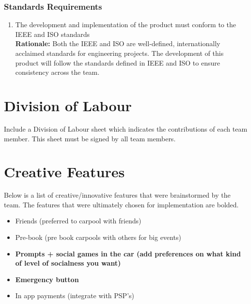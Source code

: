 \documentclass[]{article}
\begin{document}
\subsubsection{Standards Requirements}
\label{ssub:standards_requirements}
\begin{enumerate}[{LR-STD}1. ]
	\item The development and implementation of the product must conform to the IEEE and ISO standards \\
	{\bf Rationale:} Both the IEEE and ISO are well-defined, internationally acclaimed standards for engineering projects. The development of this product will follow the standards defined in IEEE and ISO to ensure consistency across the team.
\end{enumerate}



\appendix
\section{Division of Labour}
\label{sec:division_of_labour}
Include a Division of Labour sheet which indicates the contributions of each team member. This sheet must be signed by all team members.

\section{Creative Features}
\label{sec:creative_features}
Below is a list of creative/innovative features that were brainstormed by the team. The features that were ultimately chosen for implementation are bolded.
\begin{itemize}
	\item Friends (preferred to carpool with friends)
	\item Pre-book (pre book carpools with others for big events)
	\item \textbf{Prompts + social games in the car (add preferences on what kind of level of socialness you want)} 
	\item \textbf{Emergency button}
	\item In app payments (integrate with PSP's) 

\end{itemize}

\newpage
\end{document}
